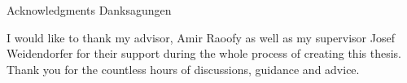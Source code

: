 \makeatletter
{}
{}
{}
\makeatother
\thispagestyle{empty}

\vspace*{20mm}

\begin{center}
\makeatletter
{}
{ Acknowledgments}
{ Danksagungen}
\makeatother
\end{center}

\vspace{10mm}

\begin{center}
I would like to thank my advisor, Amir Raoofy as well as my supervisor Josef Weidendorfer for their support during the whole process of creating this thesis. Thank you for the countless hours of discussions, guidance and advice.
\end{center}

\cleardoublepage{}
